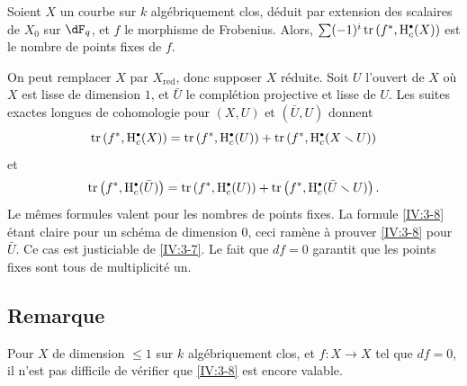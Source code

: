 \begin{corollary_}\label{IV:3-8}
Soient $X$ un courbe sur $k$ algébriquement clos, déduit par extension des 
scalaires de $X_0$ sur $\dF_q$, et $f$ le morphisme de Frobenius. Alors, 
$\sum (-1)^i \tr\left(f^\ast,\h_c^\bullet(X)\right)$ est le nombre de points 
fixes de $f$.
\end{corollary_}

On peut remplacer $X$ par $X_\text{red}$, donc supposer $X$ réduite. Soit $U$ 
l'ouvert de $X$ où $X$ est lisse de dimension $1$, et $\bar U$ le 
complétion projective et lisse de $U$. Les suites exactes longues de 
cohomologie pour $(X,U)$ et $(\bar U,U)$ donnent 
\[
  \tr\left(f^\ast,\h_c^\bullet(X)\right) = \tr\left(f^\ast,\h_c^\bullet(U)\right) + \tr\left(f^\ast,\h_c^\bullet(X\setminus U)\right) 
\]
et
\[
  \tr\left(f^\ast,\h_c^\bullet(\bar U)\right) = \tr\left(f^\ast,\h_c^\bullet(U)\right) + \tr\left(f^\ast,\h_c^\bullet(\bar U\setminus U)\right) \text{.}
\]
Le mêmes formules valent pour les nombres de points fixes. La formule 
\ref{IV:3-8} étant claire pour un schéma de dimension $0$, ceci ramène 
à prouver \ref{IV:3-8} pour $\bar U$. Ce cas est justiciable de \ref{IV:3-7}. 
Le fait que $d f=0$ garantit que les points fixes sont tous de 
multiplicité un. 





\subsection{Remarque}\label{IV:3-9}

Pour $X$ de dimension $\leqslant 1$ sur $k$ algébriquement clos, et 
$f:X\to X$ tel que $d f=0$, il n'est pas difficile de vérifier que 
\ref{IV:3-8} est encore valable. 


